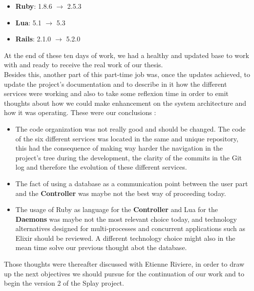 \documentclass{eplmastersthesis}
\begin{document}
        \begin{itemize}
          \item \textbf{Ruby}: 1.8.6 $\rightarrow$ 2.5.3
          \item \textbf{Lua}: 5.1 $\rightarrow$ 5.3
          \item \textbf{Rails}: 2.1.0 $\rightarrow$ 5.2.0
        \end{itemize}

        At the end of these ten days of work, we had a healthy and updated
        base to work with and ready to receive the real work of our thesis.\\

        Besides this, another part of this part-time job was, once the updates
        achieved, to update the project's documentation and to describe in
        it how the different services were working and also to take some
        reflexion time in order to emit thoughts about how we could make
        enhancement on the system architecture and how it was operating. These
        were our conclusions :

        \begin{itemize}
          \item The code organization was not really good and should be changed.
          The code of the six different services was located in the same and
          unique repository, this had the consequence of making way harder
          the navigation in the project's tree during the development, the
          clarity of the commits in the Git log and therefore the evolution
          of these different services.
          \item The fact of using a database as a communication point between
          the user part and the \textbf{Controller} was maybe not the best
          way of proceeding today.
          \item The usage of Ruby as language for the \textbf{Controller} and
          Lua for the \textbf{Daemons} was maybe not the most relevant choice
          today, and technology alternatives designed for multi-processes and
          concurrent applications such as Elixir should be reviewed. A different
          technology choice might also in the mean time solve our previous
          thought abot the database.
        \end{itemize}

        Those thoughts were thereafter discussed with Etienne Riviere, in order
        to draw up the next objectives we should pursue for the continuation
        of our work and to begin the version 2 of the Splay project.
\end{document}
